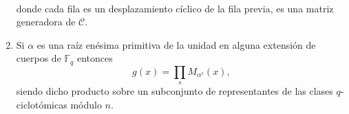 \begin{theorem}
\begin{enumerate}[resume]
\begin{align*}
    \end{align*}
    donde cada fila es un desplazamiento cíclico de la fila previa, es una matriz generadora de \(\mathcal C\).
    \item Si \(\alpha\) es una raíz enésima primitiva de la unidad en alguna extensión de cuerpos de \(\mathbb F_q\) entonces \[
      g(x) = \prod_s M_{\alpha^s}(x),
    \] siendo dicho producto sobre un subconjunto de representantes de las clases \(q\)-ciclotómicas módulo \(n\).
  \end{enumerate}
\end{theorem}

